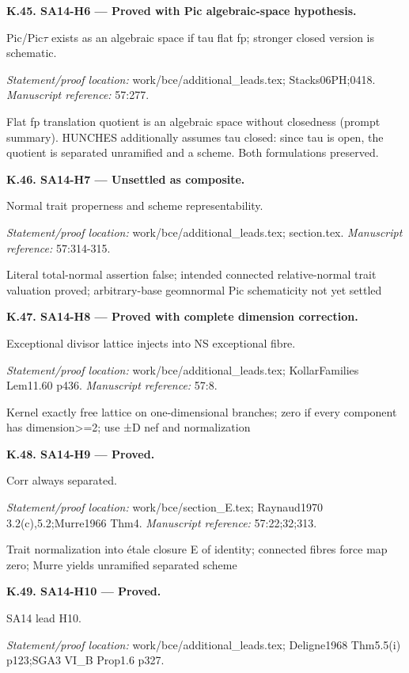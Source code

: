 \par\medskip\noindent\textbf{K.45. SA14-H6 --- Proved with Pic algebraic-space hypothesis.}\par
Pic/Pic\ensuremath{\tau} exists as an algebraic space if tau flat fp; stronger closed version is schematic.
\par\emph{Statement/proof location:} work/bce/additional\_leads.tex; Stacks06PH;0418.
\emph{Manuscript reference:} 57:277.
\par Flat fp translation quotient is an algebraic space without closedness (prompt summary). HUNCHES additionally assumes tau closed: since tau is open, the quotient is separated unramified and a scheme. Both formulations preserved.
\par\medskip\noindent\textbf{K.46. SA14-H7 --- Unsettled as composite.}\par
Normal trait properness and scheme representability.
\par\emph{Statement/proof location:} work/bce/additional\_leads.tex; section.tex.
\emph{Manuscript reference:} 57:314-315.
\par Literal total-normal assertion false; intended connected relative-normal trait valuation proved; arbitrary-base geomnormal Pic schematicity not yet settled
\par\medskip\noindent\textbf{K.47. SA14-H8 --- Proved with complete dimension correction.}\par
Exceptional divisor lattice injects into NS exceptional fibre.
\par\emph{Statement/proof location:} work/bce/additional\_leads.tex; KollarFamilies Lem11.60 p436.
\emph{Manuscript reference:} 57:8.
\par Kernel exactly free lattice on one-dimensional branches; zero if every component has dimension>=2; use ±D nef and normalization
\par\medskip\noindent\textbf{K.48. SA14-H9 --- Proved.}\par
Corr always separated.
\par\emph{Statement/proof location:} work/bce/section\_E.tex; Raynaud1970 3.2(c),5.2;Murre1966 Thm4.
\emph{Manuscript reference:} 57:22;32;313.
\par Trait normalization into étale closure E of identity; connected fibres force map zero; Murre yields unramified separated scheme
\par\medskip\noindent\textbf{K.49. SA14-H10 --- Proved.}\par
SA14 lead H10.
\par\emph{Statement/proof location:} work/bce/additional\_leads.tex; Deligne1968 Thm5.5(i) p123;SGA3 VI\_B Prop1.6 p327.
